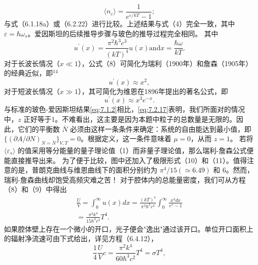 \begin{equation}\tag{7.2.17}\label{eq:7.2.17}
\langle n _ { \varepsilon } \rangle = \frac { 1 } { e ^{\varepsilon / k T} - 1 } ;
\end{equation}
与式（6.1.18a）或（6.2.22）进行比较。上述结果与式（4）完全一致，其中 \(\varepsilon = \hbar\omega_{s}\)。爱因斯坦的后续推导步骤与玻色的推导过程完全相同。
其中
\begin{equation}\tag{7.2.18}\label{eq:7.2.18}
u ^{\prime} ( x ) = \frac { \pi ^{2} \hbar ^{3} c ^{3} } { ( k T ) ^{4} } u ( x )  \mathrm { a n d }  x = \frac { \hbar \omega } { k T } .
\end{equation}
对于长波长情况（\(x \ll 1\)），公式（8）可简化为瑞利（1900年）和詹森（1905年）的经典近似，即\(^{14}\)
\begin{equation}\tag{7.2.19}\label{eq:7.2.19}
u ^{\prime} ( x ) \approx x ^{2} ,
\end{equation}
对于短波长情况（\(x \gg 1\)），其可简化为维恩在1896年提出的著名公式，即
\begin{equation}\tag{7.2.20}\label{eq:7.2.20}
u ^{\prime} ( x ) \approx x ^{3} e ^{- x} .
\end{equation}
与标准的玻色-爱因斯坦结果\autoref{eq:7.1.2}相比，\autoref{eq:7.2.17}表明，我们所面对的情况中，\(z\) 正好等于1。不难看出，这主要是因为本题中粒子的总数量是无限的。因此，它们的平衡数 \(\overline{N}\) 必须由这样一条条件来确定：系统的自由能达到最小值，即 \(\{(\partial A/\partial N)_{N=\overline{N}}\}_{V,T}=0\)。根据定义，这一条件意味着 \(\mu=0\)，从而 \(z=1\)。
若将 \(\langle\varepsilon_{s}\rangle\) 的值采用等分能量的量子理论值（1）而非量子理论值，那么瑞利-詹森公式便能直接推导出来。
为了便于比较，图中还加入了极限形式（10）和（11）。值得注意的是，普朗克曲线与维恩曲线下的面积分别约为 \(\pi^{4}/15 (\simeq 6.49)\) 和 6。然而，瑞利-詹森曲线却饱受高频灾难之苦！
对于腔体内的总能量密度，我们可从方程（8）和（9）中得出
\begin{equation}\tag{7.2.21}\label{eq:7.2.21}
\begin{array}{r} { \frac { U } { V } = \int _ { 0 } ^{\infty} u ( x ) d x = \frac { ( k T ) ^{4} } { \pi ^{2} \hbar ^{3} c ^{3} } \int _ { 0 } ^{\infty} \frac { x ^{3} d x } { e ^{x} - 1 } } \\{ = \frac { \pi ^{2} k ^{4} } { 15 \hbar ^{3} c ^{3} } T ^{4} . } \end{array}
\end{equation}
如果腔体壁上存在一个微小的开口，光子便会"逸出"通过该开口。单位开口面积上的辐射净流速可由下式给出，详见方程（6.4.12），
\begin{equation}\tag{7.2.22}\label{eq:7.2.22}
\frac { 1 } { 4 } \frac { U } { V } c = \frac { \pi ^{2} k ^{4} } { 60 \hbar ^{3} c ^{2} } T ^{4} = \sigma T ^{4} ,
\end{equation}
